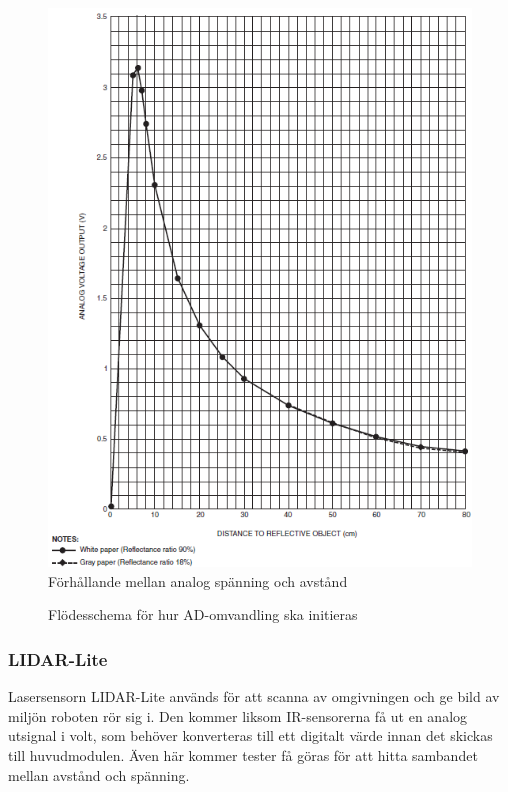 \documentclass[11pt]{article}
\begin{document}
\begin{flushleft}
\begin{figure}[htbp]
	\centering
	\includegraphics[scale=0.4]{images/IR_avstand}
	\caption{Förhållande mellan analog spänning och avstånd \label{IR_avstand}}
\end{figure}


\begin{figure}[htbp]
\centering
\noindent\resizebox{.5\linewidth}{!}{
	}
	\caption{Flödesschema för hur AD-omvandling ska initieras\label{datormodul:Avbrott_ADC}}	
\end{figure}


\FloatBarrier
\subsubsection{LIDAR-Lite}
Lasersensorn LIDAR-Lite används för att scanna av omgivningen och ge bild av miljön roboten rör sig i. Den kommer liksom IR-sensorerna få ut en analog utsignal i volt, som behöver konverteras till ett digitalt värde innan det skickas till huvudmodulen. Även här kommer tester få göras för att hitta sambandet mellan avstånd och spänning.


\end{flushleft}
\end{document}
